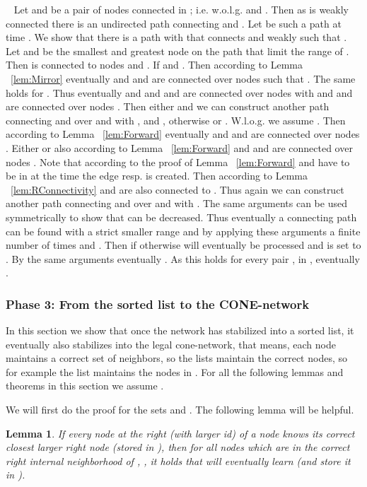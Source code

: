 \documentclass[11pt]{article}
\newtheorem{lemma}[theorem]{Lemma}
\newcommand{\sq}{\hbox{\rlap{}}}
\newcommand{\qed}{\hspace*{\fill}\sq}
\newenvironment{proof}{\noindent {\bf Proof.}\ }{\qed\par\vskip 4mm\par}
\begin{document}
\begin{proof}
Let  and  be a pair of nodes connected in ; i.e. w.o.l.g.  and . Then as  is weakly connected there is an undirected path connecting  and . Let  be such a path at time . We show that there is a path  with  that connects  and  weakly such that . Let  and  be the smallest and greatest node on the path  that limit the range of . Then  is connected to nodes  and . If  and . Then according to Lemma ~\ref{lem:Mirror} eventually  and  and  are connected over nodes  such that . The same holds for . Thus eventually  and  and  and  are connected over nodes  with  and  and  are connected over nodes . Then either  and we can construct another path connecting  and  over  and  with , and , otherwise  or . W.l.o.g. we assume . Then according to Lemma ~\ref{lem:Forward} eventually  and  and  are connected over nodes . Either  or also according to Lemma ~\ref{lem:Forward}   and  and  are connected over nodes . Note that according to the proof of Lemma ~\ref{lem:Forward}  and  have to be in  at the time the edge  resp.  is created. Then according to Lemma ~\ref{lem:RConnectivity}  and   are also connected to . Thus again we can construct another path connecting  and  over  and  with . The same arguments can be used symmetrically to show that  can be decreased. Thus eventually a connecting path can be found with a strict smaller range and by applying these arguments a finite number of times  and . Then if   otherwise  will eventually be processed and  is set to . By the same arguments eventually . As this holds for every pair ,  in , eventually .
\end{proof}

\subsubsection{Phase 3: From the sorted list to the CONE-network}

In this section we show that once the network has stabilized into a sorted list, it eventually also stabilizes into the legal cone-network, that means,
each node  maintains a correct set of neighbors, so the lists  maintain the correct nodes, so for example the list  maintains
the nodes in . For all the following lemmas and theorems in this section we assume .

We will first do the proof for the sets  and .
The following lemma will be helpful.

\begin{lemma}\label{induct1}
If every node at the right (with larger id) of a node  knows its correct closest larger right node  (stored in ), then for all nodes  which are in the correct right internal neighborhood  of , , it holds that  will eventually learn  (and store it in ).
\end{lemma}
\end{document}
